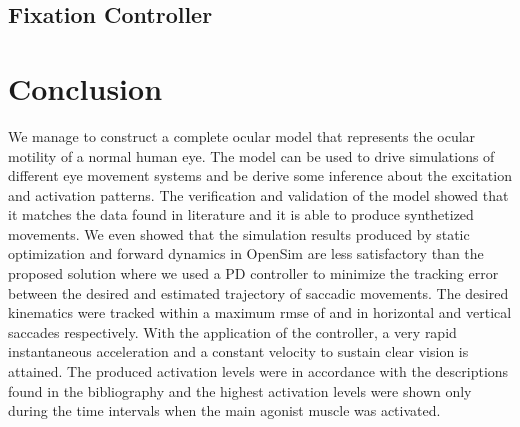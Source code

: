 \documentclass[11pt,a4paper,draft=false]{report}
\begin{document}
\subsection*{Fixation Controller}\label{sec:fixation-controller}


\section*{Conclusion}\label{sec:conclusion}

We manage to construct a complete ocular model that represents the ocular
motility of a normal human eye. The model can be used to drive simulations of
different eye movement systems and be derive some inference about the excitation
and activation patterns. The verification and validation of the model showed
that it matches the data found in literature and it is able to produce
synthetized movements. We even showed that the simulation results produced by
static optimization and forward dynamics in OpenSim are less satisfactory than
the proposed solution where we used a PD controller to minimize the tracking
error between the desired and estimated trajectory of saccadic movements. The
desired kinematics were tracked within a maximum \gls{rmse} of and in horizontal
and vertical saccades respectively. With the application of the controller, a
very rapid instantaneous acceleration and a constant velocity to sustain clear
vision is attained. The produced activation levels were in accordance with the
descriptions found in the bibliography and the highest activation levels were
shown only during the time intervals when the main agonist muscle was activated.

% 


\end{document}
